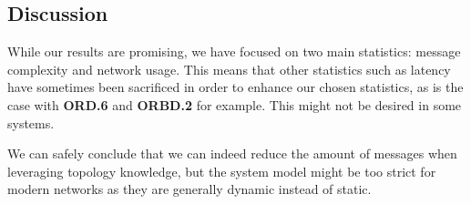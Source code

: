 \subsection{Discussion}

While our results are promising, we have focused on two main statistics: message complexity and network usage. This means that other statistics such as latency have sometimes been sacrificed in order to enhance our chosen statistics, as is the case with \textbf{ORD.6} and \textbf{ORBD.2} for example. This might not be desired in some systems.

We can safely conclude that we can indeed reduce the amount of messages when leveraging topology knowledge, but the system model might be too strict for modern networks as they are generally dynamic instead of static. 